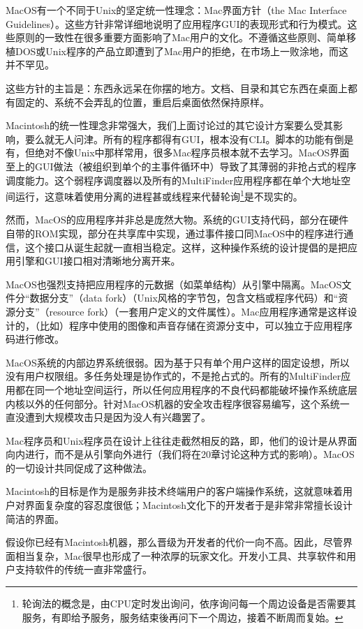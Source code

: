 \documentclass[12pt,oneside]{ctexbook}
\begin{document}
\begin{common-format}
MacOS有一个不同于Unix的坚定统一性理念：Mac界面方针（the Mac Interface Guidelines）。这些方针非常详细地说明了应用程序GUI的表现形式和行为模式。这些原则的一致性在很多重要方面影响了Mac用户的文化。不遵循这些原则、简单移植DOS或Unix程序的产品立即遭到了Mac用户的拒绝，在市场上一败涂地，而这并不罕见。

这些方针的主旨是：东西永远呆在你摆的地方。文档、目录和其它东西在桌面上都有固定的、系统不会弄乱的位置，重启后桌面依然保持原样。

Macintosh的统一性理念非常强大，我们上面讨论过的其它设计方案要么受其影响，要么就无人问津。所有的程序都得有GUI，根本没有CLI。脚本的功能有倒是有，但绝对不像Unix中那样常用，很多Mac程序员根本就不去学习。MacOS界面至上的GUI做法（被组织到单个的主事件循环中）导致了其薄弱的非抢占式的程序调度能力。这个弱程序调度器以及所有的MultiFinder应用程序都在单个大地址空间运行，这意味着使用分离的进程甚或线程来代替轮询\footnote{轮询法的概念是，由CPU定时发出询问，依序询问每一个周边设备是否需要其服务，有即给予服务，服务结束後再问下一个周边，接着不断周而复始。}是不现实的。

然而，MacOS的应用程序并非总是庞然大物。系统的GUI支持代码，部分在硬件自带的ROM实现，部分在共享库中实现，通过事件接口同MacOS中的程序进行通信，这个接口从诞生起就一直相当稳定。这样，这种操作系统的设计提倡的是把应用引擎和GUI接口相对清晰地分离开来。

MacOS也强烈支持把应用程序的元数据（如菜单结构）从引擎中隔离。MacOS文件分“数据分支”（data fork）（Unix风格的字节包，包含文档或程序代码）和“资源分支”（resource fork）（一套用户定义的文件属性）。Mac应用程序通常是这样设计的，（比如）程序中使用的图像和声音存储在资源分支中，可以独立于应用程序码进行修改。

MacOS系统的内部边界系统很弱。因为基于只有单个用户这样的固定设想，所以没有用户权限组。多任务处理是协作式的，不是抢占式的。所有的MultiFinder应用都在同一个地址空间运行，所以任何应用程序的不良代码都能破坏操作系统底层内核以外的任何部分。针对MacOS机器的安全攻击程序很容易编写，这个系统一直没遭到大规模攻击只是因为没人有兴趣罢了。

Mac程序员和Unix程序员在设计上往往走截然相反的路，即，他们的设计是从界面向内进行，而不是从引擎向外进行（我们将在20章讨论这种方式的影响）。MacOS的一切设计共同促成了这种做法。

Macintosh的目标是作为是服务非技术终端用户的客户端操作系统，这就意味着用户对界面复杂度的容忍度很低；Macintosh文化下的开发者于是非常非常擅长设计简洁的界面。

假设你已经有Macintosh机器，那么晋级为开发者的代价一向不高。因此，尽管界面相当复杂，Mac很早也形成了一种浓厚的玩家文化。开发小工具、共享软件和用户支持软件的传统一直非常盛行。


\end{common-format}
\end{document}
